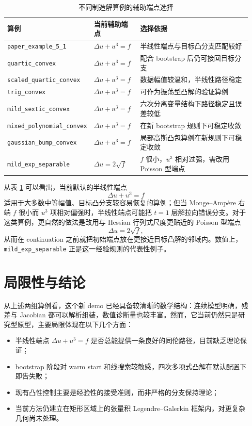 \documentclass[11pt,a4paper]{article}
\begin{document}
\begin{table}[htbp]
\centering
\caption{不同制造解算例的辅助端点选择}
\begin{tabular}{lll}
\toprule
算例 & 当前辅助端点 & 选择依据 \\
\midrule
\texttt{paper\_example\_5\_1} & $\Delta u + u^3 = f$ & 半线性端点与目标凸分支匹配较好 \\
\texttt{quartic\_convex} & $\Delta u + u^3 = f$ & 配合 bootstrap 后仍可接回目标分支 \\
\texttt{scaled\_quartic\_convex} & $\Delta u + u^3 = f$ & 数据幅值较温和，半线性路径稳定 \\
\texttt{trig\_convex} & $\Delta u + u^3 = f$ & 可作为振荡型凸解的验证算例 \\
\texttt{mild\_sextic\_convex} & $\Delta u + u^3 = f$ & 六次分离变量结构下路径稳定且误差较低 \\
\texttt{mixed\_polynomial\_convex} & $\Delta u + u^3 = f$ & 在新 bootstrap 规则下可稳定收敛 \\
\texttt{gaussian\_bump\_convex} & $\Delta u + u^3 = f$ & 局部高斯凸包算例在新规则下可稳定收敛 \\
\texttt{mild\_exp\_separable} & $\Delta u = 2\sqrt{f}$ & $f$ 很小，$u^3$ 相对过强，需改用 Poisson 型端点 \\
\bottomrule
\end{tabular}
\label{tab:aux-endpoint-selection}
\end{table}

从表 \ref{tab:aux-endpoint-selection} 可以看出，当前默认的半线性端点
\[
\Delta u + u^3 = f
\]
适用于大多数中等幅值、目标凸分支较容易恢复的算例；但当 Monge--Amp\`ere 右端 $f$ 很小而 $u^3$ 项相对偏强时，半线性端点可能把 $t=1$ 层解拉向错误分支。对于这类算例，更自然的做法是改用与 Hessian 行列式尺度更贴近的 Poisson 型端点
\[
\Delta u = 2\sqrt{f},
\]
从而在 continuation 之前就把初始端点放在更接近目标凸解的邻域内。数值上，\texttt{mild\_exp\_separable} 正是这一经验规则的代表性例子。

\section{局限性与结论}
从上述两组算例看，这个新 demo 已经具备较清晰的数学结构：连续模型明确，残差与 Jacobian 都可以解析组装，数值诊断量也较丰富。然而，它当前仍然只是研究型原型，主要局限体现在以下几个方面：
\begin{itemize}[leftmargin=2em]
\item 半线性端点 $\Delta u+u^3=f$ 是否总能提供一条良好的同伦路径，目前缺乏理论保证；
\item bootstrap 阶段对 warm start 和线搜索较敏感，四次多项式凸解在默认配置下即告失败；
\item 现有凸性控制主要是经验性的接受准则，而非严格的分支保持理论；
\item 当前方法仍建立在矩形区域上的张量积 Legendre--Galerkin 框架内，对更复杂几何尚未处理。
\end{itemize}
\end{document}
